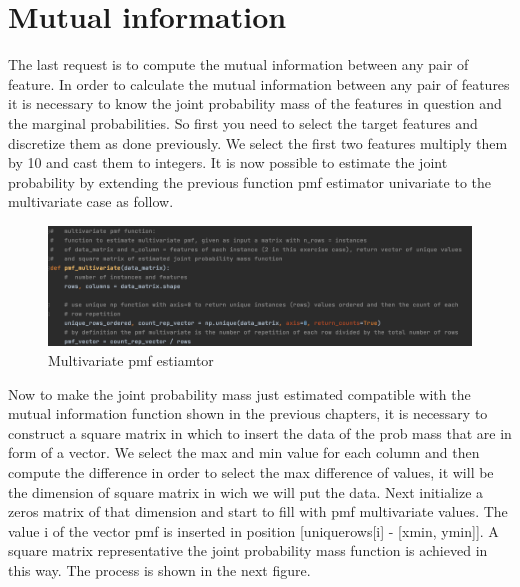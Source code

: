 \documentclass[12pt]{report}
\begin{document}
\section{Mutual information}
The last request is to compute the mutual information between any pair of feature. In order to calculate the mutual information between any pair of features it is necessary to know the joint probability mass of the features in question and the marginal probabilities. So first you need to select the target features and discretize them as done previously. We select the first two features multiply them by 10 and cast them to integers. It is now possible to estimate the joint probability by extending the previous function pmf estimator univariate to the multivariate case as follow.

\begin{figure}[h!]
    \centering
    \includegraphics[width=15cm]{Pictures/Pmf multivariate estimator.png}
    \caption{Multivariate pmf estiamtor}
\end{figure}


Now to make the joint probability mass just estimated compatible with the mutual information function shown in the previous chapters, it is necessary to construct a square matrix in which to insert the data of the prob mass that are in form of a vector. We select the max and min value for each column and then compute the difference in order to select the max difference of values, it will be the dimension of square matrix in wich we will put the data. Next initialize a zeros matrix of that dimension and start to fill with pmf multivariate values. The value i of the vector pmf is inserted in position [uniquerows[i] - [xmin, ymin]]. A square matrix representative the joint probability mass function is achieved in this way. The process is shown in the next figure.
\end{document}
